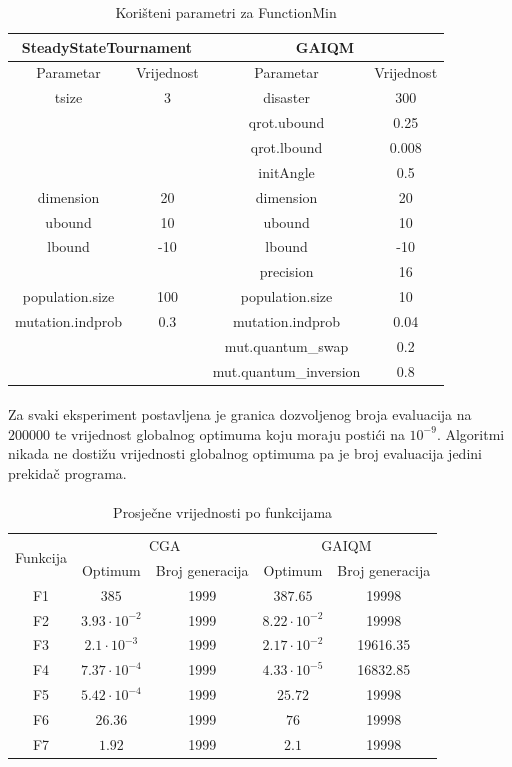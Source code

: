 \documentclass[times, utf8, zavrsni, numeric]{fer}
\begin{document}
\begin{table}[htb]
\caption{Korišteni parametri za FunctionMin}
\centering
\begin{tabular}{|c|c||c|c|} \hline
\multicolumn{2}{|c||}{SteadyStateTournament} & \multicolumn{2}{c|}{GAIQM} \\ 
\hline
Parametar & Vrijednost & Parametar & Vrijednost \\ 
\hline
tsize & 3 & disaster & 300 \\
&& qrot.ubound & 0.25 \\
&& qrot.lbound & 0.008 \\
&& initAngle & 0.5 \\
dimension & 20 & dimension & 20 \\
ubound & 10 & ubound & 10 \\
lbound & -10 & lbound & -10 \\
&& precision & 16 \\
population.size & 100 & population.size & 10 \\
mutation.indprob & 0.3 & mutation.indprob & 0.04 \\
&& mut.quantum\_swap & 0.2 \\
&& mut.quantum\_inversion & 0.8 \\
\hline
\end{tabular}
\end{table}

\paragraph{}
Za svaki eksperiment postavljena je granica dozvoljenog broja evaluacija na $200000$ te vrijednost globalnog optimuma koju moraju postići na $10^{-9}$. Algoritmi nikada ne dostižu vrijednosti globalnog optimuma pa je broj evaluacija jedini prekidač programa.

\clearpage

\paragraph{}
\begin{table}[htb]
\caption{Prosječne vrijednosti po funkcijama}
\centering
\begin{tabular}{|c|cc|cc|} \hline
\multirow{2}{*}{Funkcija} & \multicolumn{2}{c|}{CGA} & \multicolumn{2}{c|}{GAIQM} \\ \cline{2-5}
 & Optimum & Broj generacija & Optimum & Broj generacija \\ 
\hline
F1 & $385$ & 1999 & $387.65$ & 19998 \\
F2 & $3.93\cdot 10^{-2}$ & 1999 & $8.22\cdot 10^{-2}$ & 19998 \\
F3 & $2.1\cdot 10^{-3}$ & 1999 & $2.17\cdot 10^{-2}$ & 19616.35 \\
F4 & $7.37\cdot 10^{-4}$ & 1999 & $4.33\cdot 10^{-5}$ & 16832.85 \\
F5 & $5.42\cdot 10^{-4}$ & 1999 & $25.72$ & 19998 \\
F6 & $26.36$ & 1999 & $76$ & 19998 \\
F7 & $1.92$ & 1999 & $2.1$ & 19998 \\
\hline
\end{tabular}
\end{table}
\end{document}
